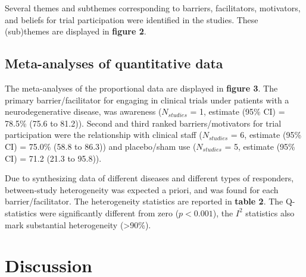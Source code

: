 \documentclass[preprint, 3p,
authoryear]{elsarticle} %
\begin{document}
Several themes and subthemes corresponding to barriers, facilitators,
motivators, and beliefs for trial participation were identified in the
studies. These (sub)themes are displayed in \textbf{figure 2}.

\hypertarget{meta-analyses-of-quantitative-data}{%
\subsection{Meta-analyses of quantitative
data}\label{meta-analyses-of-quantitative-data}}

The meta-analyses of the proportional data are displayed in
\textbf{figure 3}. The primary barrier/facilitator for engaging in
clinical trials under patients with a neurodegenerative disease, was
awareness (\(N_{studies}\) = 1, estimate (95\% CI) = 78.5\% (75.6 to
81.2)). Second and third ranked barriers/motivators for trial
participation were the relationship with clinical staff (\(N_{studies}\)
= 6, estimate (95\% CI) = 75.0\% (58.8 to 86.3)) and placebo/sham use
(\(N_{studies}\) = 5, estimate (95\% CI) = 71.2 (21.3 to 95.8)).

Due to synthesizing data of different diseases and different types of
responders, between-study heterogeneity was expected a priori, and was
found for each barrier/facilitator. The heterogeneity statistics are
reported in \textbf{table 2}. The Q-statistics were significantly
different from zero (\(p < 0.001\)), the \(I^2\) statistics also mark
substantial heterogeneity (\textgreater90\%).

\hypertarget{discussion}{%
\section{Discussion}\label{discussion}}

\renewcommand\refname{References}

\end{document}
